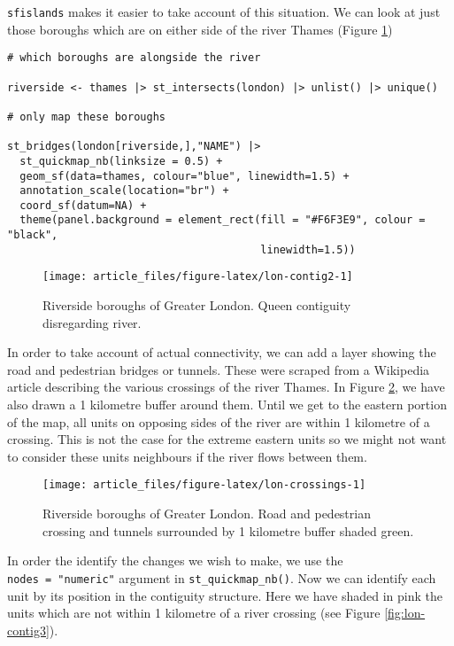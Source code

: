 \texttt{sfislands} makes it easier to take account of this situation. We can look
at just those boroughs which are on either side of the river Thames (Figure
\ref{fig:lon-contig2})

\begin{verbatim}
# which boroughs are alongside the river

riverside <- thames |> st_intersects(london) |> unlist() |> unique()

# only map these boroughs

st_bridges(london[riverside,],"NAME") |> 
  st_quickmap_nb(linksize = 0.5) +
  geom_sf(data=thames, colour="blue", linewidth=1.5) + 
  annotation_scale(location="br") +
  coord_sf(datum=NA) + 
  theme(panel.background = element_rect(fill = "#F6F3E9", colour = "black", 
                                        linewidth=1.5))
\end{verbatim}

\begin{figure}

{\centering \texttt{[image: article\_files/figure-latex/lon-contig2-1]} 

}

\caption{Riverside boroughs of Greater London. Queen contiguity disregarding river. }\label{fig:lon-contig2}
\end{figure}

In order to take account of actual connectivity, we can add a layer
showing the road and pedestrian bridges or tunnels. These were scraped from a Wikipedia article describing the various crossings of the river Thames. In Figure \ref{fig:lon-crossings}, we
have also drawn a 1 kilometre buffer around them. Until we get to the
eastern portion of the map, all units on opposing sides of the river are
within 1 kilometre of a crossing. This is not the case for the extreme
eastern units so we might not want to consider these units neighbours if
the river flows between them.

\begin{figure}

{\centering \texttt{[image: article\_files/figure-latex/lon-crossings-1]} 

}

\caption{Riverside boroughs of Greater London. Road and pedestrian crossing and tunnels surrounded by 1 kilometre buffer shaded green. }\label{fig:lon-crossings}
\end{figure}

In order the identify the changes we wish to make, we use the
\texttt{nodes\ =\ "numeric"} argument in \texttt{st\_quickmap\_nb()}. Now we can identify
each unit by its position in the contiguity structure. Here we have
shaded in pink the units which are not within 1 kilometre of a river
crossing (see Figure \ref{fig:lon-contig3}).

